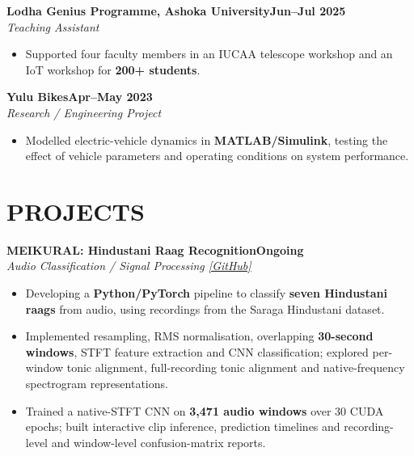 \documentclass[10pt,a4paper]{article}
\newcommand{\entry}[3]{%
  \noindent\textbf{#1}\hfill\textbf{#3}\\[-1pt]
  \textit{#2}\par
}
\newenvironment{cvitems}{%
  \begin{itemize}[leftmargin=1.15em,label=\textbullet,itemsep=2.5pt,topsep=3pt,parsep=0pt,partopsep=0pt]
}{\end{itemize}}
\begin{document}
\entry{Lodha Genius Programme, Ashoka University}{Teaching Assistant}{Jun--Jul 2025}
\begin{cvitems}
  \item Supported four faculty members in an IUCAA telescope workshop and an IoT workshop for \textbf{200+ students}.
\end{cvitems}

\entry{Yulu Bikes}{Research / Engineering Project}{Apr--May 2023}
\begin{cvitems}
  \item Modelled electric-vehicle dynamics in \textbf{MATLAB/Simulink}, testing the effect of vehicle parameters and operating conditions on system performance.
\end{cvitems}

\newpage
\section{PROJECTS}
\entry{MEIKURAL: Hindustani Raag Recognition}{Audio Classification / Signal Processing \quad \href{https://github.com/MushuRam01/MEIKURAL}{[GitHub]}}{Ongoing}
\begin{cvitems}
  \item Developing a \textbf{Python/PyTorch} pipeline to classify \textbf{seven Hindustani raags} from audio, using recordings from the Saraga Hindustani dataset.
  \item Implemented resampling, RMS normalisation, overlapping \textbf{30-second windows}, STFT feature extraction and CNN classification; explored per-window tonic alignment, full-recording tonic alignment and native-frequency spectrogram representations.
  \item Trained a native-STFT CNN on \textbf{3,471 audio windows} over 30 CUDA epochs; built interactive clip inference, prediction timelines and recording-level and window-level confusion-matrix reports.
\end{cvitems}
\end{document}
